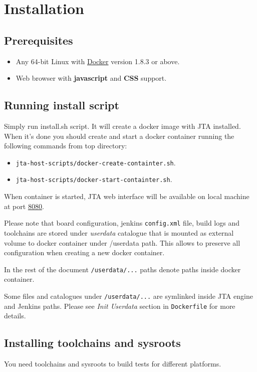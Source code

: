 \section{Installation}
\label{sec:install}

\subsection{Prerequisites}
\label{sec:prereq}

\begin{itemize}
\item Any 64-bit Linux with \href{https://www.docker.com/}{Docker} version 1.8.3 or above.
\item Web browser with \textbf{javascript} and \textbf{CSS} support.
\end{itemize}
\subsection{Running install script}
\label{sec:inst-steps}

Simply run install.sh script. It will create a docker image with JTA installed. When it's done you should create and start a docker container running the following commands from top directory: 
\begin{itemize}
\item \texttt{jta-host-scripts/docker-create-containter.sh}.
\item \texttt{jta-host-scripts/docker-start-containter.sh}.
\end{itemize}

When container is started, JTA web interface will be available on local machine at port \href{http://localhost:8080}{8080}.

Please note that board configuration, jenkins \texttt{config.xml} file, build logs and toolchains are stored under \textit{userdata} catalogue that is mounted as external volume to docker container under /userdata path. This allows to preserve all configuration when creating a new docker container. 

In the rest of the document \texttt{/userdata/...} paths denote paths inside docker container.

Some files and catalogues under \texttt{/userdata/...} are symlinked inside JTA engine and Jenkins paths. Please see \textit{Init Userdata} section in \texttt{Dockerfile} for more details.

\subsection{Installing toolchains and sysroots}
You need toolchains and sysroots to build tests for different platforms. 
\label{sec:toolchain-install}
